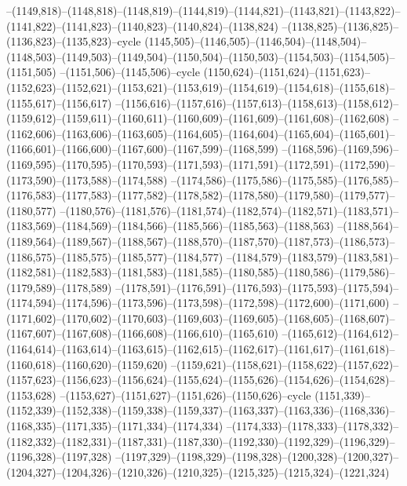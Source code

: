 --(1149,818)--(1148,818)--(1148,819)--(1144,819)--(1144,821)--(1143,821)--(1143,822)--(1141,822)--(1141,823)--(1140,823)--(1140,824)--(1138,824)
--(1138,825)--(1136,825)--(1136,823)--(1135,823)--cycle
(1145,505)--(1146,505)--(1146,504)--(1148,504)--(1148,503)--(1149,503)--(1149,504)--(1150,504)--(1150,503)--(1154,503)--(1154,505)--(1151,505)
--(1151,506)--(1145,506)--cycle
(1150,624)--(1151,624)--(1151,623)--(1152,623)--(1152,621)--(1153,621)--(1153,619)--(1154,619)--(1154,618)--(1155,618)--(1155,617)--(1156,617)
--(1156,616)--(1157,616)--(1157,613)--(1158,613)--(1158,612)--(1159,612)--(1159,611)--(1160,611)--(1160,609)--(1161,609)--(1161,608)--(1162,608)
--(1162,606)--(1163,606)--(1163,605)--(1164,605)--(1164,604)--(1165,604)--(1165,601)--(1166,601)--(1166,600)--(1167,600)--(1167,599)--(1168,599)
--(1168,596)--(1169,596)--(1169,595)--(1170,595)--(1170,593)--(1171,593)--(1171,591)--(1172,591)--(1172,590)--(1173,590)--(1173,588)--(1174,588)
--(1174,586)--(1175,586)--(1175,585)--(1176,585)--(1176,583)--(1177,583)--(1177,582)--(1178,582)--(1178,580)--(1179,580)--(1179,577)--(1180,577)
--(1180,576)--(1181,576)--(1181,574)--(1182,574)--(1182,571)--(1183,571)--(1183,569)--(1184,569)--(1184,566)--(1185,566)--(1185,563)--(1188,563)
--(1188,564)--(1189,564)--(1189,567)--(1188,567)--(1188,570)--(1187,570)--(1187,573)--(1186,573)--(1186,575)--(1185,575)--(1185,577)--(1184,577)
--(1184,579)--(1183,579)--(1183,581)--(1182,581)--(1182,583)--(1181,583)--(1181,585)--(1180,585)--(1180,586)--(1179,586)--(1179,589)--(1178,589)
--(1178,591)--(1176,591)--(1176,593)--(1175,593)--(1175,594)--(1174,594)--(1174,596)--(1173,596)--(1173,598)--(1172,598)--(1172,600)--(1171,600)
--(1171,602)--(1170,602)--(1170,603)--(1169,603)--(1169,605)--(1168,605)--(1168,607)--(1167,607)--(1167,608)--(1166,608)--(1166,610)--(1165,610)
--(1165,612)--(1164,612)--(1164,614)--(1163,614)--(1163,615)--(1162,615)--(1162,617)--(1161,617)--(1161,618)--(1160,618)--(1160,620)--(1159,620)
--(1159,621)--(1158,621)--(1158,622)--(1157,622)--(1157,623)--(1156,623)--(1156,624)--(1155,624)--(1155,626)--(1154,626)--(1154,628)--(1153,628)
--(1153,627)--(1151,627)--(1151,626)--(1150,626)--cycle
(1151,339)--(1152,339)--(1152,338)--(1159,338)--(1159,337)--(1163,337)--(1163,336)--(1168,336)--(1168,335)--(1171,335)--(1171,334)--(1174,334)
--(1174,333)--(1178,333)--(1178,332)--(1182,332)--(1182,331)--(1187,331)--(1187,330)--(1192,330)--(1192,329)--(1196,329)--(1196,328)--(1197,328)
--(1197,329)--(1198,329)--(1198,328)--(1200,328)--(1200,327)--(1204,327)--(1204,326)--(1210,326)--(1210,325)--(1215,325)--(1215,324)--(1221,324)
